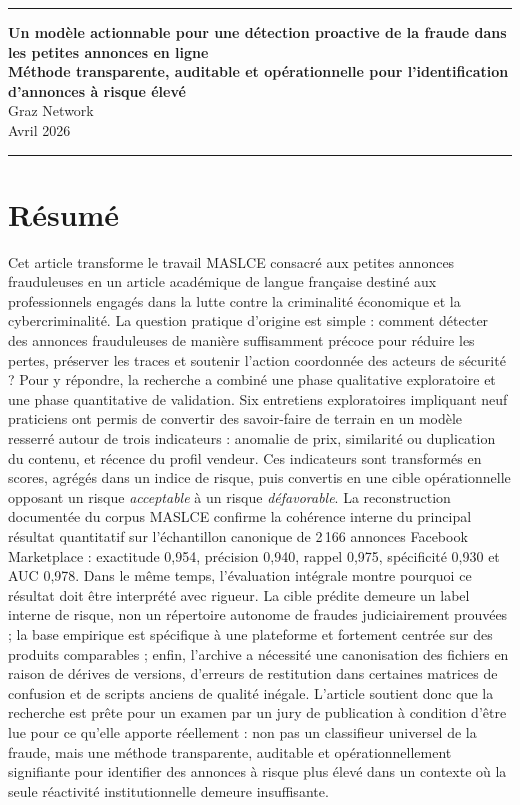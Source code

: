 \documentclass[10pt,a4paper]{article}
\newcommand{\topruleline}{\color{accent}\rule{\textwidth}{1.15pt}}
\begin{document}
\thispagestyle{empty}

{\topruleline}
\begin{center}
{\LARGE\bfseries Un modèle actionnable pour une détection proactive de la fraude dans les petites annonces en ligne}\\[0.25em]
{\large\bfseries Méthode transparente, auditable et opérationnelle pour l'identification d'annonces à risque élevé}\\[0.65em]
{\large Graz Network}\\[0.45em]
{\small Avril 2026}
\end{center}
{\topruleline}

\section*{Résumé}
Cet article transforme le travail MASLCE consacré aux petites annonces frauduleuses en un article académique de langue française destiné aux professionnels engagés dans la lutte contre la criminalité économique et la cybercriminalité. La question pratique d'origine est simple : comment détecter des annonces frauduleuses de manière suffisamment précoce pour réduire les pertes, préserver les traces et soutenir l'action coordonnée des acteurs de sécurité ? Pour y répondre, la recherche a combiné une phase qualitative exploratoire et une phase quantitative de validation. Six entretiens exploratoires impliquant neuf praticiens ont permis de convertir des savoir-faire de terrain en un modèle resserré autour de trois indicateurs : anomalie de prix, similarité ou duplication du contenu, et récence du profil vendeur. Ces indicateurs sont transformés en scores, agrégés dans un indice de risque, puis convertis en une cible opérationnelle opposant un risque \emph{acceptable} à un risque \emph{défavorable}. La reconstruction documentée du corpus MASLCE confirme la cohérence interne du principal résultat quantitatif sur l'échantillon canonique de 2\,166 annonces Facebook Marketplace : exactitude 0,954, précision 0,940, rappel 0,975, spécificité 0,930 et AUC 0,978. Dans le même temps, l'évaluation intégrale montre pourquoi ce résultat doit être interprété avec rigueur. La cible prédite demeure un label interne de risque, non un répertoire autonome de fraudes judiciairement prouvées ; la base empirique est spécifique à une plateforme et fortement centrée sur des produits comparables ; enfin, l'archive a nécessité une canonisation des fichiers en raison de dérives de versions, d'erreurs de restitution dans certaines matrices de confusion et de scripts anciens de qualité inégale. L'article soutient donc que la recherche est prête pour un examen par un jury de publication à condition d'être lue pour ce qu'elle apporte réellement : non pas un classifieur universel de la fraude, mais une méthode transparente, auditable et opérationnellement signifiante pour identifier des annonces à risque plus élevé dans un contexte où la seule réactivité institutionnelle demeure insuffisante.
\end{document}
